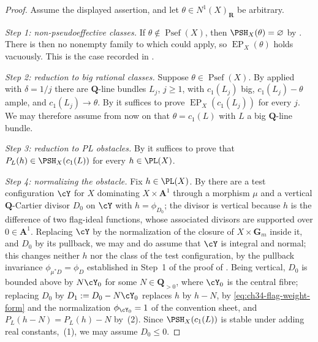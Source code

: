 \begin{proof}
Assume the displayed assertion, and let $\theta\in N^1(X)_{\mathbf R}$ be
arbitrary.

\emph{Step 1: non-pseudoeffective classes.}  If
$\theta\notin\operatorname{Psef}(X)$, then
$\PSH_X(\theta)=\varnothing$ by .  There is
then no nonempty family to which
 could apply, so
$\operatorname{EP}_X(\theta)$ holds vacuously.  This is the case recorded
in .

\emph{Step 2: reduction to big rational classes.}  Suppose
$\theta\in\operatorname{Psef}(X)$.  By
 applied with $\delta=1/j$ there are
$\mathbf Q$-line bundles $L_j$, $j\ge1$, with $c_1(L_j)$ big,
$c_1(L_j)-\theta$ ample, and $c_1(L_j)\to\theta$.  By
 it suffices to prove
$\operatorname{EP}_X(c_1(L_j))$ for every $j$.  We may therefore assume
from now on that $\theta=c_1(L)$ with $L$ a big $\mathbf Q$-line
bundle.

\emph{Step 3: reduction to PL obstacles.}  By
 it suffices to prove that
$P_L(h)\in\PSH_X(c_1(L))$ for every $h\in\PL(X)$.

\emph{Step 4: normalizing the obstacle.}  Fix $h\in\PL(X)$.  By
 there are a test configuration
$\cY$ for $X$ dominating $X\times\mathbf A^1$ through a morphism
$\mu$ and a vertical $\mathbf Q$-Cartier divisor $D_0$ on $\cY$ with
$h=\phi_{D_0}$; the divisor is vertical because $h$ is the difference of
two flag-ideal functions, whose associated divisors are supported over
$0\in\mathbf A^1$.  Replacing $\cY$ by the normalization of the closure of
$X\times\mathbf G_m$ inside it, and $D_0$ by its pullback, we may and do
assume that $\cY$ is integral and normal; this changes neither $h$ nor
the class of the test configuration, by the pullback invariance
$\phi_{\mu^*D}=\phi_D$ established in Step~1 of the proof of
.  Being vertical, $D_0$ is bounded above by
$N\cY_0$ for some $N\in\mathbf Q_{>0}$, where $\cY_0$ is the central
fibre; replacing $D_0$ by $D_1:=D_0-N\cY_0$ replaces $h$ by $h-N$,
by \eqref{eq:ch34-flag-weight-form} and the normalization
$\phi_{\cY_0}=1$ of the convention sheet, and
$P_L(h-N)=P_L(h)-N$ by \,(2).  Since
$\PSH_X(c_1(L))$ is stable under adding real constants,
\,(1), we may assume $D_0\le0$.


\end{proof}
